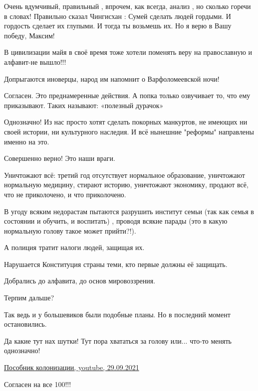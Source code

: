 \begin{itemize}
Очень вдумчивый, правильный , впрочем, как всегда, анализ , но сколько горечи в
словах! Правильно сказал Чингисхан : Сумей сделать людей гордыми. И гордость
сделает их глупыми. И тогда ты возьмешь их. Но я верю в Вашу победу, Максим!


В цивилизации майя в своё время тоже хотели поменять веру на православную и
алфавит-не вышло!!!

Допрыгаются иноверцы, народ им напомнит о Варфоломеевской ночи!


Согласен. Это преднамеренные действия. А попка только озвучивает то, что ему
приказывают. Таких называют: «полезный дурачок»


Однозначно! Из нас просто хотят сделать покорных манкуртов, не имеющих ни своей
истории, ни культурного наследия. И всё нынешние "реформы" направлены именно на
это.


Совершенно верно! Это наши враги.

Уничтожают всё: третий год отсутствует нормальное образование, уничтожают
нормальную медицину, стирают историю, уничтожают экономику, продают всё, что не
приколочено, и что приколочено.

В угоду всяким недорастам пытаются разрушить институт семьи (так как семья в
состоянии и обучить, и воспитать) , проводя всякие парады (это в какую
нормальную голову такое может прийти?!).

А полиция тратит налоги людей, защищая их.

Нарушается Конституция страны теми, кто первые должны её защищать.

Добрались до алфавита, до основ мировоззрения.

Терпим дальше?


Так ведь и у большевиков были подобные планы. Но в последний момент
остановились.


Да какие тут нах шутки!  Тут пора хвататься за голову или... что-то менять
однозначно!


\href{https://youtu.be/6FeMEGJ4WzU}{%
Пособник колонизации, youtube, 29.09.2021%
}

Согласен на все 100!!!

\end{itemize} %
